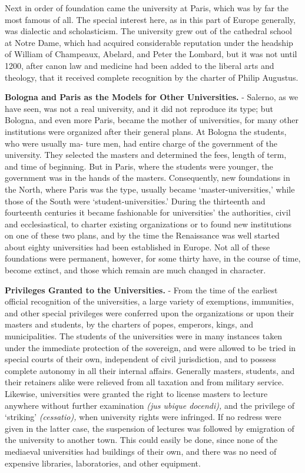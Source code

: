 \documentclass[
]{book}
\begin{document}
Next in order of foundation came the university at Paris, which was by far the most famous of all. The special interest here, as in this part of Europe generally, was dialectic and scholasticism. The university grew out of the cathedral school at Notre Dame, which had acquired considerable reputation under the headship of William of Champeaux, Abelard, and Peter the Lombard, but it was not until 1200, after canon law and medicine had been added to the liberal arts and theology, that it received complete recognition by the charter of Philip Augustus.

\textbf{Bologna and Paris as the Models for Other Universities.} - Salerno, as we have seen, was not a real university, and it did not reproduce its type; but Bologna, and even more Paris, became the mother of universities, for many other institutions were organized after their general plans. At Bologna the students, who were usually ma- ture men, had entire charge of the government of the university. They selected the masters and determined the fees, length of term, and time of beginning. But in Paris, where the students were younger, the government was in the hands of the masters. Consequently, new foundations in the North, where Paris was the type, usually became `master-universities,' while those of the South were `student-universities.' During the thirteenth and fourteenth centuries it became fashionable for universities' the authorities, civil and ecclesiastical, to charter existing organizations or to found new institutions on one of these two plans, and by the time the Renaissance was well started about eighty universities had been established in Europe. Not all of these foundations were permanent, however, for some thirty have, in the course of time, become extinct, and those which remain are much changed in character.

\textbf{Privileges Granted to the Universities.} - From the time of the earliest official recognition of the universities, a large variety of exemptions, immunities, and other special privileges were conferred upon the organizations or upon their masters and students, by the charters of popes, emperors, kings, and municipalities. The students of the universities were in many instances taken under the immediate protection of the sovereign, and were allowed to be tried in special courts of their own, independent of civil jurisdiction, and to possess complete autonomy in all their internal affairs. Generally masters, students, and their retainers alike were relieved from all taxation and from military service. Likewise, universities were granted the right to license masters to lecture anywhere without further examination \emph{(jus ubique docendi),} and the privilege of `striking' \emph{(cessatio),} when university rights were infringed. If no redress were given in the latter case, the suspension of lectures was followed by emigration of the university to another town. This could easily be done, since none of the mediaeval universities had buildings of their own, and there was no need of expensive libraries, laboratories, and other equipment.
\end{document}
